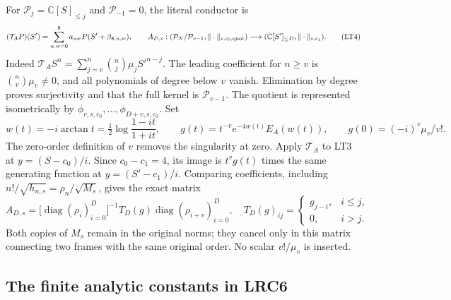 For $\mathcal P_j=\mathbb C[S]_{\le j}$ and
$\mathcal P_{-1}=0$, the literal conductor is
\[
 (\mathcal T_AP)(S')=\sum_{u,w=0}^{8}a_{uw}P(S'+\beta_{8,u,w}),
 \qquad
 A_{D,s}:(\mathcal P_N/\mathcal P_{v-1},\|\cdot\|_{s,c_0,\rm quot})
       \longrightarrow(\mathbb C[S']_{\le D},\|\cdot\|_{s,c_1}).
                                                               \tag{LT4}
\]
Indeed $\mathcal T_AS^n=\sum_{j=v}^n\binom nj\mu_jS'^{n-j}$.
The leading coefficient for $n\ge v$ is $\binom nv\mu_v\ne0$,
and all polynomials of degree below $v$ vanish. Elimination by degree
proves surjectivity and that the full kernel is $\mathcal P_{v-1}$.
The quotient is represented isometrically by
$\phi_{v,s,c_0},\ldots,\phi_{D+v,s,c_0}$.
Set
\[
 w(t)=-i\arctan t=\tfrac12\log\frac{1-it}{1+it},\qquad
 g(t)=t^{-v}e^{-4w(t)}E_A(w(t)),\qquad
 g(0)=(-i)^v\mu_v/v! .                                  \tag{LT5}
\]
The zero-order definition of $v$ removes the singularity at zero.
Apply $\mathcal T_A$ to LT3 at $y=(S-c_0)/i$.
Since $c_0-c_1=4$, its image is $t^vg(t)$ times the same generating
function at $y=(S'-c_1)/i$. Comparing coefficients, including
$n!/\sqrt{h_{n,s}}=\rho_n/\sqrt{M_s}$, gives the exact matrix
\[
 A_{D,s}=\bigl[\operatorname{diag}(\rho_i)_{i=0}^D\bigr]^{-1}
             T_D(g)\operatorname{diag}(\rho_{i+v})_{i=0}^D,
 \quad T_D(g)_{ij}=\begin{cases}g_{j-i},&i\le j,\\0,&i>j.\end{cases}
                                                               \tag{LT6}
\]
Both copies of $M_s$ remain in the original norms; they cancel only
in this matrix connecting two frames with the same original order.
No scalar $v!/\mu_v$ is inserted.

\subsection{The finite analytic constants in LRC6}

